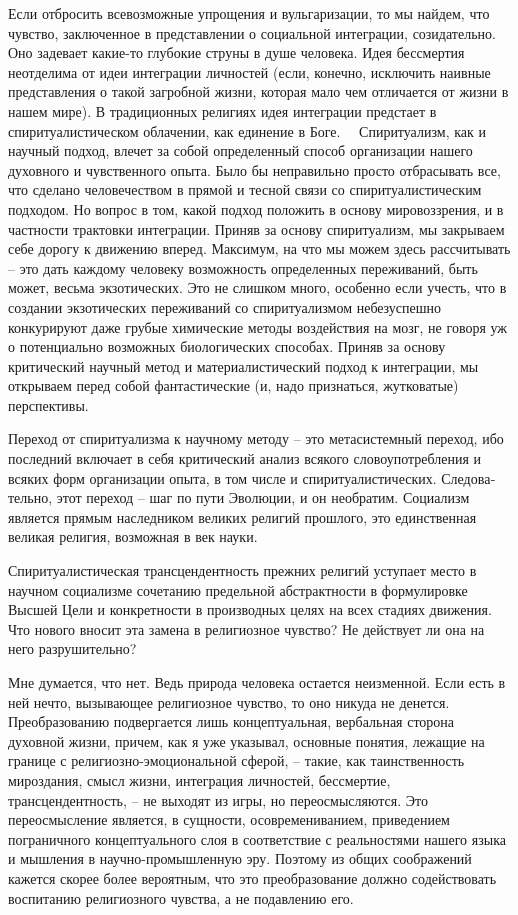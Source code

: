 \documentclass{book}
\begin{document}
Если отбросить всевозможные упрощения и вульгаризации, то мы найдем, что чувство, заключенное в представлении о со­циальной интеграции, созидательно. Оно задевает какие-то глу­бокие струны в душе человека. Идея бессмертия неотделима от идеи интеграции личностей (если, конечно, исключить наив­ные представления о такой загробной жизни, которая мало чем отличается от жизни в нашем мире). В традиционных религиях идея интеграции предстает в спиритуалистическом облачении, как единение в Боге.   Спиритуализм, как и научный подход, влечет за собой определенный способ организации нашего духов­ного и чувственного опыта. Было бы неправильно просто отбра­сывать все, что сделано человечеством в прямой и тесной связи со спиритуалистическим подходом. Но вопрос в том, какой подход положить в основу  мировоззрения, и в частности трактовки интеграции. Приняв за основу спиритуализм, мы закры­ваем себе дорогу к движению вперед. Максимум, на что мы можем здесь рассчитывать -- это дать каждому человеку воз­можность определенных 
переживаний, быть может, весьма экзо­тических. Это не слишком много, особенно если учесть, что в создании экзотических переживаний со спиритуализмом небе­зуспешно конкурируют даже грубые химические методы воз­действия на мозг, не говоря уж о потенциально возможных биологических способах. Приняв за основу критический науч­ный метод и материалистический подход к интеграции, мы открываем перед собой фантастические (и, надо признаться, жутковатые) перспективы.

Переход от спиритуализма к научному методу -- это метасистемный переход, ибо последний включает в себя критиче­ский анализ всякого словоупотребления и всяких форм орга­низации опыта, в том числе и спиритуалистических. Следова­тельно, этот переход -- шаг по пути Эволюции, и он необратим. Социализм является прямым наследником великих религий прошлого, это единственная великая религия, возможная в век науки.

Спиритуалистическая трансцендентность прежних религий ус­тупает место в научном социализме сочетанию предельной аб­страктности в формулировке Высшей Цели и конкретности в производных целях на всех стадиях движения. Что нового вносит эта замена в религиозное чувство? Не действует ли она на него разрушительно?

Мне думается, что нет. Ведь природа человека остается неиз­менной. Если есть в ней нечто, вызывающее религиозное чувст­во, то оно никуда не денется. Преобразованию подвергается лишь концептуальная, вербальная сторона духовной жизни, причем, как я уже указывал, основные понятия, лежащие на границе с религиозно-эмоциональной сферой, -- такие, как таинст­венность мироздания, смысл жизни, интеграция личностей, бес­смертие, трансцендентность, -- не выходят из игры, но перео­смысляются.  Это переосмысление является, в сущности, осовремениванием, приведением пограничного концептуального слоя в соответствие с реальностями нашего языка и мышления в научно-промышленную эру. Поэтому из общих соображений кажется скорее более вероятным, что это преобразование должно содействовать воспитанию религиозного чувства, а не подавлению его.
\end{document}
